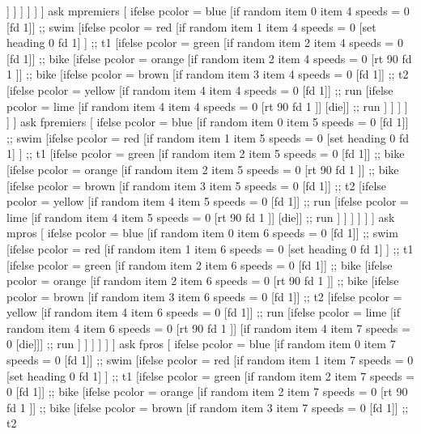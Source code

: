 \documentclass[12pt]{article}
\begin{document}
             ]
           ]
         ]
       ]
     ]
    ]
  ask mpremiers [
    ifelse pcolor = blue [if random item 0 item 4 speeds  = 0 [fd 1]] ;; swim
    [ifelse pcolor = red [if random item 1 item 4 speeds  = 0 [set heading 0 fd 1] ] ;; t1
     [ifelse pcolor = green [if random item 2 item 4 speeds  = 0 [fd 1]] ;; bike
       [ifelse pcolor = orange [if random item 2 item 4 speeds  = 0 [rt 90 fd 1 ]] ;; bike
         [ifelse pcolor = brown [if random item 3 item 4 speeds  = 0 [fd 1]] ;; t2
           [ifelse pcolor = yellow [if random item 4 item 4 speeds  = 0 [fd 1]] ;; run
             [ifelse pcolor = lime [if random item 4 item 4 speeds  = 0 [rt 90 fd 1 ]] [die]] ;; run
             ]
           ]
         ]
       ]
     ]
    ]
  ask fpremiers [
    ifelse pcolor = blue [if random item 0 item 5 speeds  = 0 [fd 1]] ;; swim
    [ifelse pcolor = red [if random item 1 item 5 speeds  = 0 [set heading 0 fd 1] ] ;; t1
     [ifelse pcolor = green [if random item 2 item 5 speeds  = 0 [fd 1]] ;; bike
       [ifelse pcolor = orange [if random item 2 item 5 speeds  = 0 [rt 90 fd 1 ]] ;; bike
         [ifelse pcolor = brown [if random item 3 item 5 speeds  = 0 [fd 1]] ;; t2
           [ifelse pcolor = yellow [if random item 4 item 5 speeds  = 0 [fd 1]] ;; run
             [ifelse pcolor = lime [if random item 4 item 5 speeds  = 0 [rt 90 fd 1 ]] [die]] ;; run
             ]
           ]
         ]
       ]
     ]
    ]
  ask mpros [
    ifelse pcolor = blue [if random item 0 item 6 speeds  = 0 [fd 1]] ;; swim
    [ifelse pcolor = red [if random item 1 item 6 speeds  = 0 [set heading 0 fd 1] ] ;; t1
     [ifelse pcolor = green [if random item 2 item 6 speeds  = 0 [fd 1]] ;; bike
       [ifelse pcolor = orange [if random item 2 item 6 speeds  = 0 [rt 90 fd 1 ]] ;; bike
         [ifelse pcolor = brown [if random item 3 item 6 speeds  = 0 [fd 1]] ;; t2
           [ifelse pcolor = yellow [if random item 4 item 6 speeds  = 0 [fd 1]] ;; run
             [ifelse pcolor = lime [if random item 4 item 6 speeds  = 0 [rt 90 fd 1 ]] 
               [if random item 4 item 7 speeds  = 0 [die]]] ;; run
             ]
           ]
         ]
       ]
     ]
    ]
  ask fpros [
    ifelse pcolor = blue [if random item 0 item 7 speeds  = 0 [fd 1]] ;; swim
    [ifelse pcolor = red [if random item 1 item 7 speeds  = 0 [set heading 0 fd 1] ] ;; t1
     [ifelse pcolor = green [if random item 2 item 7 speeds  = 0 [fd 1]] ;; bike
       [ifelse pcolor = orange [if random item 2 item 7 speeds  = 0 [rt 90 fd 1 ]] ;; bike
         [ifelse pcolor = brown [if random item 3 item 7 speeds  = 0 [fd 1]] ;; t2
\end{document}
